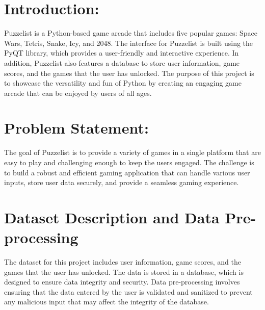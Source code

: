 \documentclass[16pt]{article}
\begin{document}
\clearpage

\tableofcontents

\clearpage

\section{Introduction:}
Puzzelist is a Python-based game arcade that includes five popular games: Space Wars, Tetris, Snake, Icy, and 2048. The interface for Puzzelist is built using the PyQT library, which provides a user-friendly and interactive experience. In addition, Puzzelist also features a database to store user information, game scores, and the games that the user has unlocked. The purpose of this project is to showcase the versatility and fun of Python by creating an engaging game arcade that can be enjoyed by users of all ages.

\section{Problem Statement:}
The goal of Puzzelist is to provide a variety of games in a single platform that are easy to play and challenging enough to keep the users engaged. The challenge is to build a robust and efficient gaming application that can handle various user inputs, store user data securely, and provide a seamless gaming experience.

\section{Dataset Description and Data Pre-processing}
The dataset for this project includes user information, game scores, and the games that the user has unlocked. The data is stored in a database, which is designed to ensure data integrity and security. Data pre-processing involves ensuring that the data entered by the user is validated and sanitized to prevent any malicious input that may affect the integrity of the database.
\end{document}

